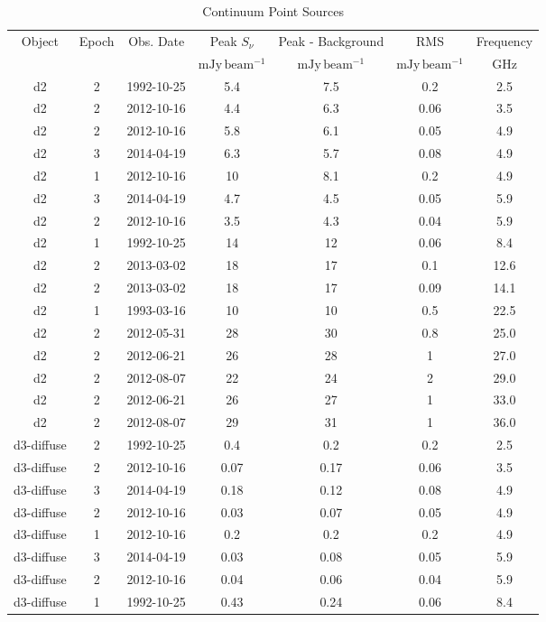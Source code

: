 \begin{table*}[htp]
\caption{Continuum Point Sources}
\begin{tabular}{ccccccc}
\label{tab:contsrcs_full}
Object & Epoch & Obs. Date & Peak $S_{\nu}$ & Peak - Background & RMS & Frequency \\
 &  &  & $\mathrm{mJy\,beam^{-1}}$ & $\mathrm{mJy\,beam^{-1}}$ & $\mathrm{mJy\,beam^{-1}}$ & $\mathrm{GHz}$ \\
\hline
d2 & 2 & 1992-10-25 & 5.4 & 7.5 & 0.2 & 2.5 \\
d2 & 2 & 2012-10-16 & 4.4 & 6.3 & 0.06 & 3.5 \\
d2 & 2 & 2012-10-16 & 5.8 & 6.1 & 0.05 & 4.9 \\
d2 & 3 & 2014-04-19 & 6.3 & 5.7 & 0.08 & 4.9 \\
d2 & 1 & 2012-10-16 & 10 & 8.1 & 0.2 & 4.9 \\
d2 & 3 & 2014-04-19 & 4.7 & 4.5 & 0.05 & 5.9 \\
d2 & 2 & 2012-10-16 & 3.5 & 4.3 & 0.04 & 5.9 \\
d2 & 1 & 1992-10-25 & 14 & 12 & 0.06 & 8.4 \\
d2 & 2 & 2013-03-02 & 18 & 17 & 0.1 & 12.6 \\
d2 & 2 & 2013-03-02 & 18 & 17 & 0.09 & 14.1 \\
d2 & 1 & 1993-03-16 & 10 & 10 & 0.5 & 22.5 \\
d2 & 2 & 2012-05-31 & 28 & 30 & 0.8 & 25.0 \\
d2 & 2 & 2012-06-21 & 26 & 28 & 1 & 27.0 \\
d2 & 2 & 2012-08-07 & 22 & 24 & 2 & 29.0 \\
d2 & 2 & 2012-06-21 & 26 & 27 & 1 & 33.0 \\
d2 & 2 & 2012-08-07 & 29 & 31 & 1 & 36.0 \\
d3-diffuse & 2 & 1992-10-25 & 0.4 & 0.2 & 0.2 & 2.5 \\
d3-diffuse & 2 & 2012-10-16 & 0.07 & 0.17 & 0.06 & 3.5 \\
d3-diffuse & 3 & 2014-04-19 & 0.18 & 0.12 & 0.08 & 4.9 \\
d3-diffuse & 2 & 2012-10-16 & 0.03 & 0.07 & 0.05 & 4.9 \\
d3-diffuse & 1 & 2012-10-16 & 0.2 & 0.2 & 0.2 & 4.9 \\
d3-diffuse & 3 & 2014-04-19 & 0.03 & 0.08 & 0.05 & 5.9 \\
d3-diffuse & 2 & 2012-10-16 & 0.04 & 0.06 & 0.04 & 5.9 \\
d3-diffuse & 1 & 1992-10-25 & 0.43 & 0.24 & 0.06 & 8.4 \\

\end{tabular}
\end{table*}
